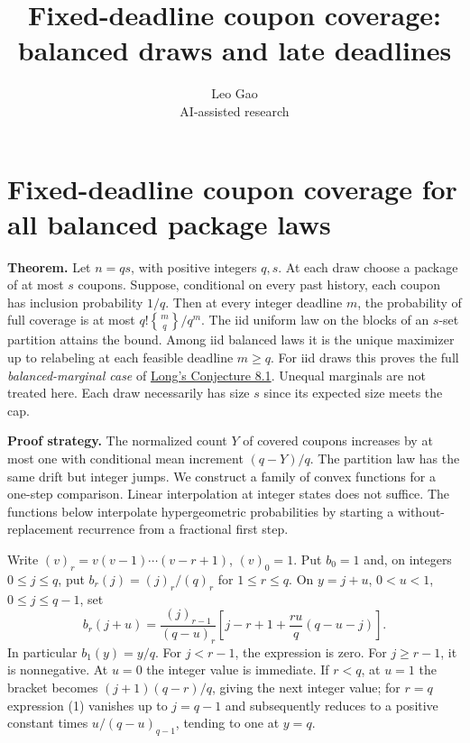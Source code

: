 \documentclass[10pt]{article}
\title{Fixed-deadline coupon coverage:\\balanced draws and late deadlines}
\author{Leo Gao\\\small AI-assisted research}
\date{}
\begin{document}
\maketitle

\section*{Fixed-deadline coupon coverage for all balanced package
laws}\label{fixed-deadline-coupon-coverage-for-all-balanced-package-laws}

\textbf{Theorem.} Let \(n=qs\), with positive integers \(q,s\). At each
draw choose a package of at most \(s\) coupons. Suppose, conditional on
every past history, each coupon has inclusion probability \(1/q\). Then
at every integer deadline \(m\), the probability of full coverage is at
most \(q!{m\brace q}/q^m\). The iid uniform law on the blocks of an
\(s\)-set partition attains the bound. Among iid balanced laws it is the
unique maximizer up to relabeling at each feasible deadline \(m\ge q\).
For iid draws this proves the full \emph{balanced-marginal case} of
\href{https://hexagonmath.org/pdf/2611.00814v1}{Long's Conjecture 8.1}.
Unequal marginals are not treated here. Each draw necessarily has size
\(s\) since its expected size meets the cap.

\textbf{Proof strategy.} The normalized count \(Y\) of covered coupons
increases by at most one with conditional mean increment \((q-Y)/q\).
The partition law has the same drift but integer jumps. We construct a
family of convex functions for a one-step comparison. Linear
interpolation at integer states does not suffice. The functions below
interpolate hypergeometric probabilities by starting a
without-replacement recurrence from a fractional first step.

Write \((v)_r=v(v-1)\cdots(v-r+1)\), \((v)_0=1\). Put \(b_0=1\) and, on
integers \(0\le j\le q\), put \(b_r(j)=(j)_r/(q)_r\) for
\(1\le r\le q\). On \(y=j+u\), \(0<u<1\), \(0\le j\le q-1\), set \[
 b_r(j+u)=\frac{(j)_{r-1}}{(q-u)_r}
      \left[j-r+1+\frac{ru}{q}(q-u-j)\right].                 \tag{1}
\] In particular \(b_1(y)=y/q\). For \(j<r-1\), the expression is zero.
For \(j\ge r-1\), it is nonnegative. At \(u=0\) the integer value is
immediate. If \(r<q\), at \(u=1\) the bracket becomes \((j+1)(q-r)/q\),
giving the next integer value; for \(r=q\) expression (1) vanishes up to
\(j=q-1\) and subsequently reduces to a positive constant times
\(u/(q-u)_{q-1}\), tending to one at \(y=q\).
\end{document}
